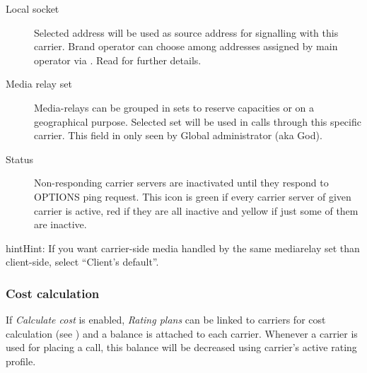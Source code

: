 \documentclass[letterpaper,10pt,english]{sphinxmanual}
\begin{document}
\begin{description}
\item[{Local socket}] \leavevmode{}\label{administration_portal/brand/providers/carriers:term-local-socket}
Selected address will be used as source address for signalling with this carrier. Brand operator can choose among
addresses assigned by main operator via {\hyperref[administration_portal/platform/brands:brands]{}}. Read {\hyperref[administration_portal/platform/infrastructure/proxy_trunks:proxy\string-trunks]{}} for further details.

\item[{Media relay set}] \leavevmode{}\label{administration_portal/brand/providers/carriers:term-media-relay-set}
Media-relays can be grouped in sets to reserve capacities or on a geographical purpose. Selected set will be used
in calls through this specific carrier. This field in only seen by Global administrator (aka God).

\item[{Status}] \leavevmode{}\label{administration_portal/brand/providers/carriers:term-status}
Non-responding carrier servers are inactivated until they respond to OPTIONS ping request. This icon is green if
every carrier server of given carrier is active, red if they are all inactive and yellow if just some of them are inactive.

\end{description}

\begin{notice}{hint}{Hint:}
If you want carrier-side media handled by the same mediarelay set than client-side, select ``Client's default''.
\end{notice}


\subsubsection{Cost calculation}
\label{administration_portal/brand/providers/carriers:cost-calculation}
If \emph{Calculate cost} is enabled, \emph{Rating plans} can be linked to carriers for cost calculation (see
{\hyperref[administration_portal/brand/billing/rating_plans:assigning\string-rating\string-plans\string-to\string-carriers]{}}) and a balance is attached to each carrier. Whenever a carrier is used for
placing a call, this balance will be decreased using carrier's active rating profile.
\end{document}
